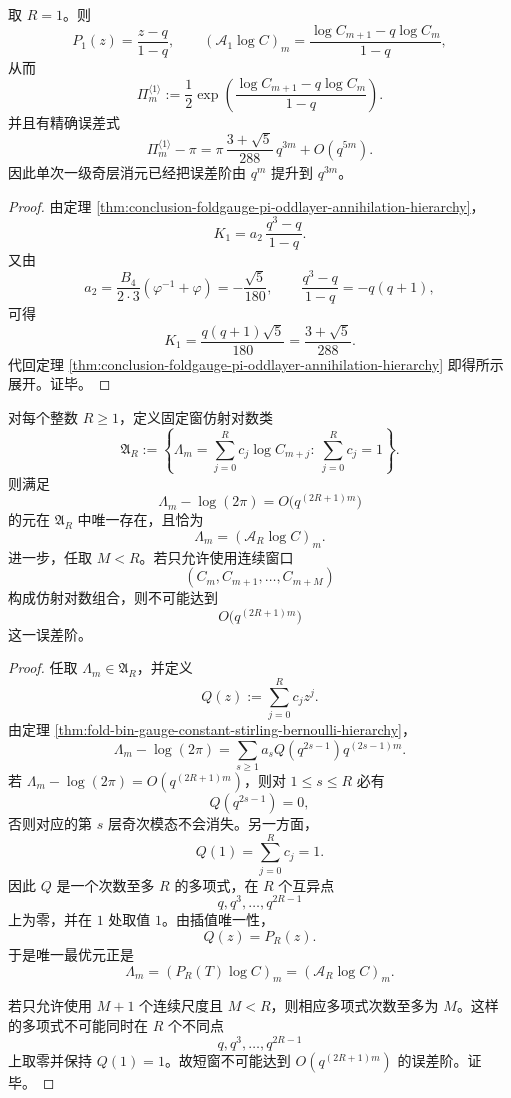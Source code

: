 \begin{corollary}[一级有限窗加速器的三奇阶提升]\label{cor:conclusion-foldgauge-pi-first-window-cubic-lift}
取 \(R=1\)。则
\[
P_1(z)=\frac{z-q}{1-q},
\qquad
(\mathcal A_1\log C)_m
=
\frac{\log C_{m+1}-q\log C_m}{1-q},
\]
从而
\[
\Pi_m^{\langle1\rangle}
:=
\frac12\exp\!\left(\frac{\log C_{m+1}-q\log C_m}{1-q}\right).
\]
并且有精确误差式
\[
\Pi_m^{\langle1\rangle}-\pi
=
\pi\,\frac{3+\sqrt5}{288}\,q^{3m}
+
O(q^{5m}).
\]
因此单次一级奇层消元已经把误差阶由 \(q^m\) 提升到 \(q^{3m}\)。
\end{corollary}
\begin{proof}
由定理 \ref{thm:conclusion-foldgauge-pi-oddlayer-annihilation-hierarchy}，
\[
K_1
=
a_2\,\frac{q^3-q}{1-q}.
\]
又由
\[
a_2=
\frac{B_4}{2\cdot 3}(\varphi^{-1}+\varphi)
=
-\frac{\sqrt5}{180},
\qquad
\frac{q^3-q}{1-q}=-q(q+1),
\]
可得
\[
K_1
=
\frac{q(q+1)\sqrt5}{180}
=
\frac{3+\sqrt5}{288}.
\]
代回定理 \ref{thm:conclusion-foldgauge-pi-oddlayer-annihilation-hierarchy} 即得所示展开。证毕。
\end{proof}

\begin{theorem}[固定窗仿射对数加速器的唯一最优性]\label{thm:conclusion-foldgauge-pi-affine-log-accelerator-uniqueness}
对每个整数 \(R\ge 1\)，定义固定窗仿射对数类
\[
\mathfrak A_R
:=
\left\{
\Lambda_m=\sum_{j=0}^{R}c_j\log C_{m+j}:\ \sum_{j=0}^{R}c_j=1
\right\}.
\]
则满足
\[
\Lambda_m-\log(2\pi)=O\!\bigl(q^{(2R+1)m}\bigr)
\]
的元在 \(\mathfrak A_R\) 中唯一存在，且恰为
\[
\Lambda_m=(\mathcal A_R\log C)_m.
\]
进一步，任取 \(M<R\)。若只允许使用连续窗口
\[
(C_m,C_{m+1},\dots,C_{m+M})
\]
构成仿射对数组合，则不可能达到
\[
O\!\bigl(q^{(2R+1)m}\bigr)
\]
这一误差阶。
\end{theorem}
\begin{proof}
任取 \(\Lambda_m\in\mathfrak A_R\)，并定义
\[
Q(z):=\sum_{j=0}^{R}c_j z^j.
\]
由定理 \ref{thm:fold-bin-gauge-constant-stirling-bernoulli-hierarchy}，
\[
\Lambda_m-\log(2\pi)
=
\sum_{s\ge 1}a_s Q(q^{2s-1})q^{(2s-1)m}.
\]
若 \(\Lambda_m-\log(2\pi)=O(q^{(2R+1)m})\)，则对 \(1\le s\le R\) 必有
\[
Q(q^{2s-1})=0,
\]
否则对应的第 \(s\) 层奇次模态不会消失。另一方面，
\[
Q(1)=\sum_{j=0}^{R}c_j=1.
\]
因此 \(Q\) 是一个次数至多 \(R\) 的多项式，在 \(R\) 个互异点
\[
q,q^3,\dots,q^{2R-1}
\]
上为零，并在 \(1\) 处取值 \(1\)。由插值唯一性，
\[
Q(z)=P_R(z).
\]
于是唯一最优元正是
\[
\Lambda_m=(P_R(T)\log C)_m=(\mathcal A_R\log C)_m.
\]

若只允许使用 \(M+1\) 个连续尺度且 \(M<R\)，则相应多项式次数至多为 \(M\)。这样的多项式不可能同时在 \(R\) 个不同点
\[
q,q^3,\dots,q^{2R-1}
\]
上取零并保持 \(Q(1)=1\)。故短窗不可能达到 \(O(q^{(2R+1)m})\) 的误差阶。证毕。
\end{proof}

